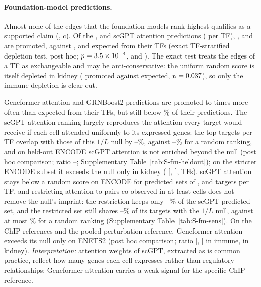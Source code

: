 \paragraph{Foundation-model predictions.}
Almost none of the edges that the foundation models rank highest qualifies as a supported claim (, c).
Of the \nMethNpImm{}, \nMethNpKid{} and \nMethNpLung{} scGPT attention predictions (\nTopK{} per TF), \nMethNImm{}, \nMethNKid{} and \nMethNLung{} are promoted, against \nMethExpImm{}, \nMethExpKid{} and \nMethExpLung{} expected from their TFs (exact TF-stratified depletion test, post hoc; $p=3.5\times10^{-4}{}$, \nMethPKid{} and \nMethPLung{}).
The exact test treats the edges of a TF as exchangeable and may be anti-conservative: the uniform random score is itself depleted in kidney (\nMethNRandKid{} promoted against \nMethExpRandKid{} expected, $p=0.037{}$), so only the immune depletion is clear-cut.

Geneformer attention and GRNBoost2 predictions are promoted \nMethRatioMinW{} to \nMethRatioMaxW{} times more often than expected from their TFs, but still below \nMethFracBound{}\% of their predictions.
The scGPT attention ranking largely reproduces the attention every target would receive if each cell attended uniformly to its expressed genes: the \nTopK{} top targets per TF overlap with those of this $1/L$ null by \nFmOverlapPctMin{}--\nFmOverlapPctMax{}\%, against \nFmOverlapRandPctMin{}--\nFmOverlapRandPctMax{}\% for a random ranking, and on held-out ENCODE scGPT attention is not enriched beyond the null (post hoc comparison; ratio \nFmEncRatioScMin{}--\nFmEncRatioScMax{}; Supplementary Table~\ref{tab:S-fm-heldout}); on the stricter ENCODE subset it exceeds the null only in kidney (\nFmStrictRatioScKid{} [\nFmStrictRatioScKidLo{}, \nFmStrictRatioScKidHi{}], \nFmStrictScKidTfs{} TFs).
scGPT attention stays below a random score on ENCODE for predicted sets of \nTopKSensLo{}, \nTopK{} and \nTopKSensHi{} targets per TF, and restricting attention to pairs co-observed in at least \nFmMinCoobs{} cells does not remove the null's imprint: the restriction keeps only \nFmCoobsRetPctMin{}--\nFmCoobsRetPctMax{}\% of the scGPT predicted set, and the restricted set still shares \nFmCoobsOvPctMin{}--\nFmCoobsOvPctMax{}\% of its targets with the $1/L$ null, against at most \nFmCoobsOvRandPctMax{}\% for a random ranking (Supplementary Table~\ref{tab:S-fm-sens}).
On the ChIP references and the pooled perturbation reference, Geneformer attention exceeds its null only on ENETS2 (post hoc comparison; ratio \nFmEnetRatioGfImm{} [\nFmEnetRatioGfImmLo{}, \nFmEnetRatioGfImmHi{}] in immune, \nFmEnetRatioGfKid{} in kidney).
\emph{Interpretation:} attention weights of scGPT, extracted as is common practice, reflect how many genes each cell expresses rather than regulatory relationships; Geneformer attention carries a weak signal for the specific ChIP reference.

